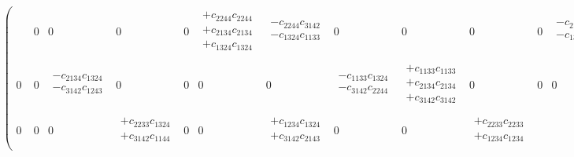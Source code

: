 \begin{eqnarray}
\begin{pmatrix}
\begin{array}{l}
\end{array} &
0 &
0 &
0 &
0 &
\begin{array}{l}
+c_{2244}c_{2244} \\
+c_{2134}c_{2134} \\
+c_{1324}c_{1324} \\
\end{array} &
\begin{array}{l}
-c_{2244}c_{3142} \\
-c_{1324}c_{1133} \\
\end{array} &
0 &
0 &
0 &
0 &
\begin{array}{l}
-c_{2134}c_{3142} \\
-c_{1324}c_{1243} \\
\end{array} &
0 &
0 \\
0 &
0 &
\begin{array}{l}
-c_{2134}c_{1324} \\
-c_{3142}c_{1243} \\
\end{array} &
0 &
0 &
0 &
0 &
\begin{array}{l}
-c_{1133}c_{1324} \\
-c_{3142}c_{2244} \\
\end{array} &
\begin{array}{l}
+c_{1133}c_{1133} \\
+c_{2134}c_{2134} \\
+c_{3142}c_{3142} \\
\end{array} &
0 &
0 &
0 &
0 &
\begin{array}{l}
+c_{1133}c_{1243} \\
+c_{2134}c_{2244} \\
\end{array} &
0 &
0 \\
0 &
0 &
0 &
\begin{array}{l}
+c_{2233}c_{1324} \\
+c_{3142}c_{1144} \\
\end{array} &
0 &
0 &
\begin{array}{l}
+c_{1234}c_{1324} \\
+c_{3142}c_{2143} \\
\end{array} &
0 &
0 &
\begin{array}{l}
+c_{2233}c_{2233} \\
+c_{1234}c_{1234} \\

\end{array}
\end{pmatrix}
\end{eqnarray}
